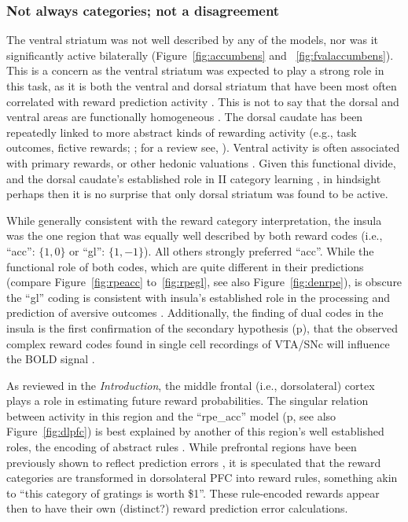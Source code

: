 \subsubsection{Not always categories; not a disagreement}
\label{subsub:conana}
The ventral striatum was not well described by any of the models, nor was it significantly active bilaterally (Figure~\ref{fig:accumbens} and ~\ref{fig:fvalaccumbens}).  This is a concern as the ventral striatum was expected to play a strong role in this task, as it is both the ventral and dorsal striatum that have been most often correlated with reward prediction activity \citep{ODoherty:2003p6329,Knutson:2007p1687,Schonberg:2007p518}.  This is not to say that the dorsal and ventral areas are functionally homogeneous \citep{Schonberg:2009p6669,ODoherty:2004p1269,Atallah:2007p1746}.  The dorsal caudate has been repeatedly linked to more abstract kinds of rewarding activity (e.g., task outcomes, fictive rewards; \citet{Tricomi:2008p6663,Lohrenz:2007p7240}; for a review see, \citet{Grahn:2008p4654}).  Ventral activity is often associated with primary rewards, or other hedonic valuations \citep{ODoherty:2004p1269}.  Given this functional divide, and the dorsal caudate's established role in II category learning \citep{Ashby:1998p9716}, in hindsight perhaps then it is no surprise that only dorsal striatum was found to be active.

While generally consistent with the reward category interpretation, the insula was the one region that was equally well described by both reward codes (i.e., ``acc'': $\{1,0\}$ or ``gl'': $\{1,-1\}$).  All others strongly preferred ``acc''.  While the functional role of both codes, which are quite different in their predictions (compare Figure~\ref{fig:rpeacc} to~\ref{fig:rpegl}, see also Figure~\ref{fig:denrpe}), is obscure the ``gl'' coding is consistent with insula's established role in the processing and prediction of aversive outcomes \citep{Chua:1999p9833,Phillips:1998p9834,Buchel:1998p9836,Elliott:2000p1637}.  Additionally, the finding of dual codes in the insula is the first confirmation of the secondary hypothesis (p\pageref{subsub:codesandfits}), that the observed complex reward codes found in single cell recordings of VTA/SNc will influence the BOLD signal \citep{Kim:2006p1063,Matsumoto:2009p7219,Smith:2011p8133}.

As reviewed in the \emph{Introduction}, the middle frontal (i.e., dorsolateral) cortex plays a role in estimating future reward probabilities.  The singular relation between activity in this region and the ``rpe\_acc'' model (p\pageref{subsub:onsheet}, see also Figure~\ref{fig:dlpfc}) is best explained by another of this region's well established roles, the encoding of abstract rules \citep{Wallis:2001p8129}.  While prefrontal regions have been previously shown to reflect prediction errors \citep{Ramnani:2004p5390}, it is speculated that the reward categories are transformed in dorsolateral PFC into reward rules, something akin to ``this category of gratings is worth \$1''.  These rule-encoded rewards appear then to have their own (distinct?) reward prediction error calculations.

